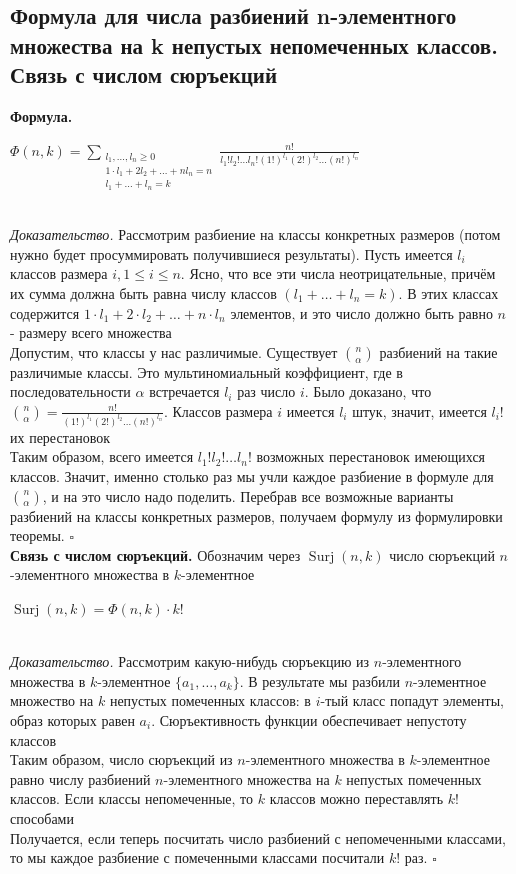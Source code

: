\documentclass[a4paper]{article}
\newcommand{\qed}{\hfill$\square$}
\begin{document}
\subsection{Формула для числа разбиений n-элементного множества на k непустых непомеченных классов. Связь с числом сюръекций}
\textbf{Формула.}\\[2mm]
\centerline{$\Phi(n,k)=\sum\limits_{\substack{l_1,\ldots,l_n\geqslant0\\1\cdot l_1+2l_2+\ldots+nl_n=n\\l_1+\ldots+l_n=k}} \frac{n!}{l_1!l_2!\ldots l_n!(1!)^{l_1}(2!)^{l_2}\ldots(n!)^{l_n}}$}\\[2mm]
\textit{Доказательство.} Рассмотрим разбиение на классы конкретных размеров (потом нужно будет просуммировать получившиеся результаты). Пусть имеется $l_{i}$ классов размера $i, 1 \leqslant i \leqslant n$. Ясно, что все эти числа неотрицательные, причём их сумма должна быть равна числу классов $\left(l_{1}+\ldots+l_{n}=k\right)$. В этих классах содержится $1 \cdot l_{1}+2 \cdot l_{2}+\ldots+n \cdot l_{n}$ элементов, и это число должно быть равно $n$ - размеру всего множества\\[2mm]
\indent Допустим, что классы у нас различимые. Существует $\binom{n}{\alpha}$ разбиений на такие различимые классы. Это мультиномиальный коэффициент, где в последовательности $\alpha$ встречается $l_{i}$ раз число $i$. Было доказано, что $\binom{n}{\alpha}=\frac{n !}{(1 !)^{l_{1}}(2 !)^{l_{2}} \ldots(n !)^{l_{n}}}$. Классов размера $i$ имеется $l_{i}$ штук, значит, имеется $l_{i}$! их перестановок\\[2mm]
\indent Таким образом, всего имеется $l_{1} ! l_{2} ! \ldots l_{n} !$ возможных перестановок имеющихся классов. Значит, именно столько раз мы учли каждое разбиение в формуле для $\binom{n}{\alpha}$, и на это число надо поделить. Перебрав все возможные варианты разбиений на классы конкретных размеров, получаем формулу из формулировки теоремы. \qed\\[2mm]
\textbf{Связь с числом сюръекций.} Обозначим через $\operatorname{Surj}(n, k)$ число сюръекций $n$-элементного множества в $k$-элементное\\[2mm]
\centerline{$\operatorname{Surj}(n, k)=\Phi(n, k) \cdot k$!}\\[2mm]
\textit{Доказательство.} Рассмотрим какую-нибудь сюръекцию из $n$-элементного множества в $k$-элементное $\{a_1,\ldots,a_k\}$. В результате мы разбили $n$-элементное множество на $k$ непустых помеченных классов: в $i$-тый класс попадут элементы, образ которых равен $a_i$. Сюръективность функции обеспечивает непустоту классов\\[2mm]
\indent Таким образом, число сюръекций из $n$-элементного множества в $k$-элементное равно числу разбиений $n$-элементного множества на $k$ непустых помеченных классов. Если классы непомеченные, то $k$ классов можно переставлять $k!$ способами\\[2mm]
\indent Получается, если теперь посчитать число разбиений с непомеченными классами, то мы каждое разбиение с помеченными классами посчитали $k!$ раз. \qed
\end{document}
